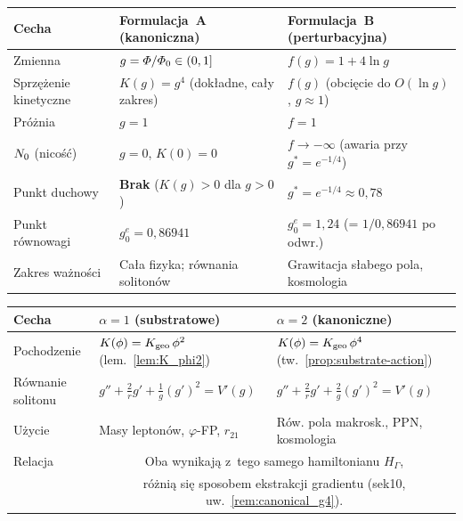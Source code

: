 \begin{center}\small
\renewcommand{\arraystretch}{1.3}
\begin{tabular}{@{}p{2.8cm}p{5.0cm}p{5.0cm}@{}}
\toprule
\textbf{Cecha} & \textbf{Formulacja~A (kanoniczna)} & \textbf{Formulacja~B (perturbacyjna)} \\
\midrule
Zmienna & $g = \varPhi/\varPhi_0 \in (0,1]$ & $f(g) = 1 + 4\ln g$ \\
Sprz\k{e}\.zenie kinetyczne & $K(g) = g^4$ (dok\l{}adne, ca\l{}y zakres) & $f(g)$ (obci\k{e}cie do $O(\ln g)$, $g \approx 1$) \\
Pr\'o\.znia & $g = 1$ & $f = 1$ \\
$N_0$ (nico\'s\'c) & $g = 0$, $K(0) = 0$ & $f \to -\infty$ (awaria przy $g^* = e^{-1/4}$) \\
Punkt duchowy & \textbf{Brak} ($K(g) > 0$ dla $g > 0$) & $g^* = e^{-1/4} \approx 0{,}78$ \\
Punkt r\'ownowagi & $g_0^e = 0{,}86941$ & $g_0^e = 1{,}24$ (= $1/0{,}86941$ po odwr.) \\
Zakres wa\.zno\'sci & Ca\l{}a fizyka; r\'ownania soliton\'ow & Grawitacja s\l{}abego pola, kosmologia \\
\bottomrule
\end{tabular}
\end{center}

\begin{center}\small
\renewcommand{\arraystretch}{1.3}
\begin{tabular}{@{}p{2.8cm}p{5.0cm}p{5.0cm}@{}}
\toprule
\textbf{Cecha} & \textbf{$\alpha = 1$ (substratowe)} & \textbf{$\alpha = 2$ (kanoniczne)} \\
\midrule
Pochodzenie & $K(\phi) = K_{\rm geo}\,\phi^2$ (lem.~\ref{lem:K_phi2}) & $K(\phi) = K_{\rm geo}\,\phi^4$ (tw.~\ref{prop:substrate-action}) \\
R\'ownanie solitonu & $g'' + \frac{2}{r}g' + \frac{1}{g}(g')^2 = V'(g)$ & $g'' + \frac{2}{r}g' + \frac{2}{g}(g')^2 = V'(g)$ \\
U\.zycie & Masy lepton\'ow, $\varphi$-FP, $r_{21}$ & R\'ow. pola makrosk., PPN, kosmologia \\
Relacja & \multicolumn{2}{c}{Oba wynikaj\k{a} z~tego samego hamiltonianu $H_\Gamma$,} \\
        & \multicolumn{2}{c}{r\'o\.zni\k{a} si\k{e} sposobem ekstrakcji gradientu (sek10, uw.~\ref{rem:canonical_g4}).} \\
\bottomrule
\end{tabular}
\end{center}

